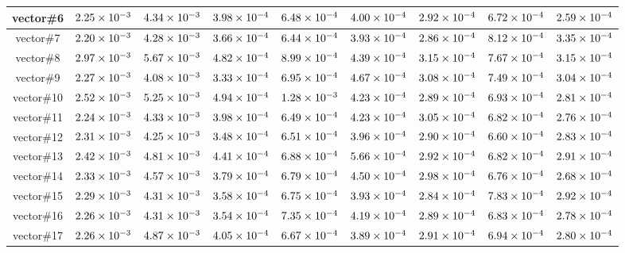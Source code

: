 \documentclass[../main.tex]{subfiles}
\begin{document}
\begin{table}[ht]
\begin{tabular}{|c|c|c|c|c|c|c|c|c|}
    \rowcolor[HTML]{C0C0C0}
    vector\#6  & $\num{2.25E-03}$ & $\num{4.34E-03}$ & $\num{3.98E-04}$ & $\num{6.48E-04}$ & $\num{4.00E-04}$ & $\num{2.92E-04}$ & $\num{6.72E-04}$ & $\num{2.59E-04}$ \\ \hline
    vector\#7  & $\num{2.20E-03}$ & $\num{4.28E-03}$ & $\num{3.66E-04}$ & $\num{6.44E-04}$ & $\num{3.93E-04}$ & $\num{2.86E-04}$ & $\num{8.12E-04}$ & $\num{3.35E-04}$ \\ \hline
    \rowcolor[HTML]{C0C0C0}
    vector\#8  & $\num{2.97E-03}$ & $\num{5.67E-03}$ & $\num{4.82E-04}$ & $\num{8.99E-04}$ & $\num{4.39E-04}$ & $\num{3.15E-04}$ & $\num{7.67E-04}$ & $\num{3.15E-04}$ \\ \hline
    vector\#9  & $\num{2.27E-03}$ & $\num{4.08E-03}$ & $\num{3.33E-04}$ & $\num{6.95E-04}$ & $\num{4.67E-04}$ & $\num{3.08E-04}$ & $\num{7.49E-04}$ & $\num{3.04E-04}$ \\ \hline
    \rowcolor[HTML]{C0C0C0}
    vector\#10 & $\num{2.52E-03}$ & $\num{5.25E-03}$ & $\num{4.94E-04}$ & $\num{1.28E-03}$ & $\num{4.23E-04}$ & $\num{2.89E-04}$ & $\num{6.93E-04}$ & $\num{2.81E-04}$ \\ \hline
    vector\#11 & $\num{2.24E-03}$ & $\num{4.33E-03}$ & $\num{3.98E-04}$ & $\num{6.49E-04}$ & $\num{4.23E-04}$ & $\num{3.05E-04}$ & $\num{6.82E-04}$ & $\num{2.76E-04}$ \\ \hline
    \rowcolor[HTML]{C0C0C0}
    vector\#12 & $\num{2.31E-03}$ & $\num{4.25E-03}$ & $\num{3.48E-04}$ & $\num{6.51E-04}$ & $\num{3.96E-04}$ & $\num{2.90E-04}$ & $\num{6.60E-04}$ & $\num{2.83E-04}$ \\ \hline
    vector\#13 & $\num{2.42E-03}$ & $\num{4.81E-03}$ & $\num{4.41E-04}$ & $\num{6.88E-04}$ & $\num{5.66E-04}$ & $\num{2.92E-04}$ & $\num{6.82E-04}$ & $\num{2.91E-04}$ \\ \hline
    \rowcolor[HTML]{C0C0C0}
    vector\#14 & $\num{2.33E-03}$ & $\num{4.57E-03}$ & $\num{3.79E-04}$ & $\num{6.79E-04}$ & $\num{4.50E-04}$ & $\num{2.98E-04}$ & $\num{6.76E-04}$ & $\num{2.68E-04}$ \\ \hline
    vector\#15 & $\num{2.29E-03}$ & $\num{4.31E-03}$ & $\num{3.58E-04}$ & $\num{6.75E-04}$ & $\num{3.93E-04}$ & $\num{2.84E-04}$ & $\num{7.83E-04}$ & $\num{2.92E-04}$ \\ \hline
    \rowcolor[HTML]{C0C0C0}
    vector\#16 & $\num{2.26E-03}$ & $\num{4.31E-03}$ & $\num{3.54E-04}$ & $\num{7.35E-04}$ & $\num{4.19E-04}$ & $\num{2.89E-04}$ & $\num{6.83E-04}$ & $\num{2.78E-04}$ \\ \hline
    vector\#17 & $\num{2.26E-03}$ & $\num{4.87E-03}$ & $\num{4.05E-04}$ & $\num{6.67E-04}$ & $\num{3.89E-04}$ & $\num{2.91E-04}$ & $\num{6.94E-04}$ & $\num{2.80E-04}$ \\ \hline

\end{tabular}
\end{table}
\end{document}
